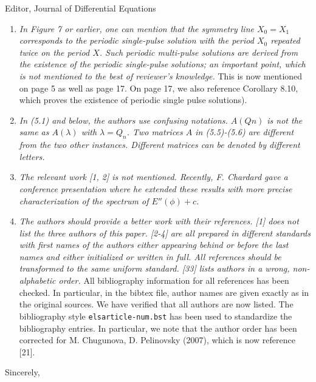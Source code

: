 \documentclass[11pt]{letter}
\begin{document}
\begin{letter}{Editor, Journal of Differential Equations}
\begin{enumerate}
    \item \emph{In Figure 7 or earlier, one can mention that the symmetry line $X_0 = X_1$ corresponds to the periodic single-pulse solution with the period $X_0$ repeated twice on the period $X$. Such periodic multi-pulse solutions are derived from the existence of the periodic single-pulse solutions; an important point, which is not mentioned to the best of reviewer’s knowledge.} This is now mentioned on page 5 as well as page 17. On page 17, we also reference Corollary 8.10, which proves the existence of periodic single pulse solutions).
    \vspace{4mm}

    \item \emph{In (5.1) and below, the authors use confusing notations. $A(Qn)$ is not the same as $A(\lambda)$ with $\lambda = Q_n$. Two matrices $A$ in (5.5)-(5.6) are different from the two other instances. Different matrices can be denoted by different letters.}
    \vspace{4mm}

    \item \emph{The relevant work [1, 2] is not mentioned. Recently, F. Chardard gave a conference presentation where he extended these results with more precise characterization of the spectrum of $E''(\phi) + c$.}
    \vspace{4mm}

    \item \emph{The authors should provide a better work with their references. [1] does not list the three authors of this paper. [2-4] are all prepared in different standards with first names of the authors either appearing behind or before the last names and either initialized or written in full. All references should be transformed to the same uniform standard. [33] lists authors in a wrong, non-alphabetic order.} All bibliography information for all references has been checked. In particular, in the bibtex file, author names are given exactly as in the original sources. We have verified that all authors are now listed. The bibliography style \texttt{elsarticle-num.bst} has been used to standardize the bibliography entries. In particular, we note that the author order has been corrected for M. Chugunova, D. Pelinovsky (2007), which is now reference [21].
\end{enumerate}



\closing{Sincerely,}

\end{letter}
\end{document}
